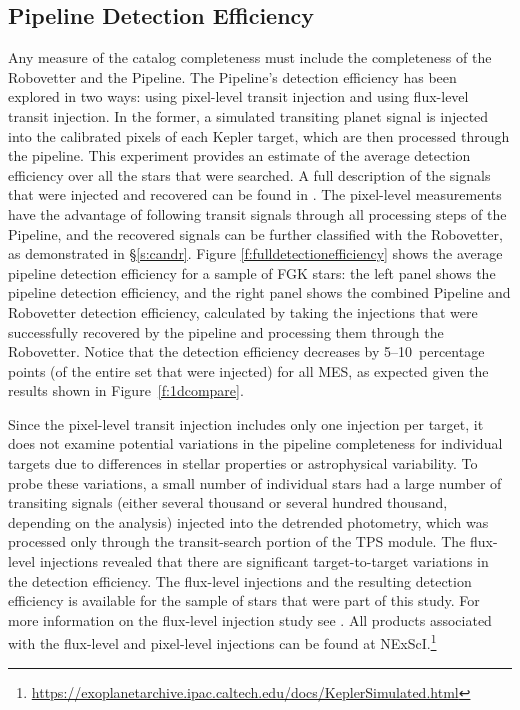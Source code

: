 \subsection{Pipeline Detection Efficiency}

Any measure of the catalog completeness must include the completeness of the Robovetter and the \Kepler{} Pipeline. The Pipeline's detection efficiency has been explored in two ways: using pixel-level transit injection and using flux-level transit injection. In the former, a simulated transiting planet signal is injected into the calibrated pixels of each Kepler target, which are then processed through the pipeline. This experiment provides an estimate of the average detection efficiency over all the stars that were searched. A full description of the signals that were injected and recovered can be found in \citet{Christiansen2017}. The pixel-level measurements have the advantage of following transit signals through all processing steps of the \Kepler{} Pipeline, and the recovered signals can be further classified with the Robovetter, as demonstrated in \S\ref{s:candr}. Figure \ref{f:fulldetectionefficiency} shows the average pipeline detection efficiency for a sample of FGK stars: the left panel shows the pipeline detection efficiency, and the right panel shows the combined Pipeline and Robovetter detection efficiency, calculated by taking the injections that were successfully recovered by the pipeline and processing them through the Robovetter. Notice that the detection efficiency decreases by 5--10~percentage points (of the entire set that were injected) for all MES, as expected given the results shown in Figure~\ref{f:1dcompare}.


Since the pixel-level transit injection includes only one injection per target, it does not examine potential variations in the pipeline completeness for individual targets due to differences in stellar properties or astrophysical variability. To probe these variations, a small number of individual stars had a large number of transiting signals (either several thousand or several hundred thousand, depending on the analysis) injected into the detrended photometry, which was processed only through the transit-search portion of the TPS module. The flux-level injections revealed that there are significant target-to-target variations in the detection efficiency. The flux-level injections and the resulting detection efficiency is available for the sample of stars that were part of this study. For more information on the flux-level injection study see \citet{Burke2017c}. All products associated with the flux-level and pixel-level injections can be found at NExScI.\footnote{\url{https://exoplanetarchive.ipac.caltech.edu/docs/KeplerSimulated.html}}


